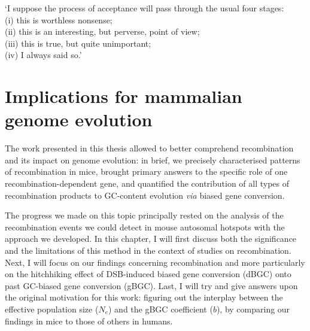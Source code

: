 \begin{savequote}[8cm]

	‘I suppose the process of acceptance will pass through the usual four stages:\\
	(i) this is worthless nonsense;\\
	(ii) this is an interesting, but perverse, point of view;\\
	(iii) this is true, but quite unimportant;\\
	(iv) I always said so.’
	
	
\end{savequote}

\chapter{\label{ch:9-discussion}Implications for mammalian genome evolution}


\minitoc{}


The work presented in this thesis allowed to better comprehend recombination and its impact on genome evolution: 
in brief, we precisely characterised patterns of recombination in mice, brought primary answers to the specific role of one recombination-dependent gene, and quantified the contribution of all types of recombination products to GC-content evolution \textit{via} biased gene conversion.

The progress we made on this topic principally rested on the analysis of the recombination events we could detect in mouse autosomal hotspots with the approach we developed. 
In this chapter, I will first discuss both the significance and the limitations of this method in the context of studies on recombination.
Next, I will focus on our findings concerning recombination and more particularly on the hitchhiking effect of DSB-induced biased gene conversion (dBGC) onto past GC-biased gene conversion (gBGC).
Last, I will try and give answers upon the original motivation for this work: figuring out the interplay between the effective population size ($N_e$) and the gBGC coefficient ($b$), by comparing our findings in mice to those of others in humans.

